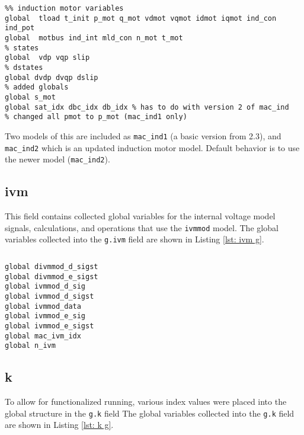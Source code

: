 \begin{lstlisting}[caption={Induction Load Global Field Variables},label={lst: ind g}]
\end{lstlisting}\vspace{-2 em}
\begin{verbatim}
%% induction motor variables
global  tload t_init p_mot q_mot vdmot vqmot idmot iqmot ind_con ind_pot
global  motbus ind_int mld_con n_mot t_mot
% states
global  vdp vqp slip
% dstates
global dvdp dvqp dslip
% added globals
global s_mot
global sat_idx dbc_idx db_idx % has to do with version 2 of mac_ind
% changed all pmot to p_mot (mac_ind1 only)
\end{verbatim}

Two models of this are included as \verb|mac_ind1| (a basic version from 2.3), and \verb|mac_ind2| which is an updated induction motor model. Default behavior is to use the newer model (\verb|mac_ind2|).

\subsection{ivm} 
This field contains collected global variables for the internal voltage model signals, calculations, and operations that use the \verb|ivmmod| model.
The global variables collected into the \verb|g.ivm| field are shown in Listing \ref{lst: ivm g}.

\begin{lstlisting}[caption={IVMMOD Global Field Variables},label={lst: ivm g}]
\end{lstlisting}\vspace{-2 em}
\begin{verbatim}
global divmmod_d_sigst
global divmmod_e_sigst
global ivmmod_d_sig
global ivmmod_d_sigst
global ivmmod_data
global ivmmod_e_sig
global ivmmod_e_sigst
global mac_ivm_idx
global n_ivm
\end{verbatim}

\subsection{k}  
To allow for functionalized running, various index values were placed into the global structure in the \verb|g.k| field
The global variables collected into the \verb|g.k| field are shown in Listing \ref{lst: k g}.

